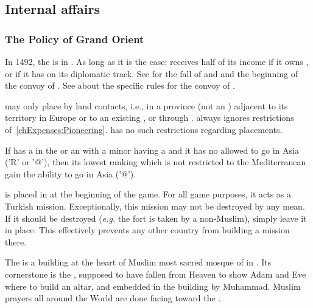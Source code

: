 \subsection{Internal affairs}
\subsubsection{The Policy of Grand Orient}
 In 1492, the  is in
. As long as it is the case:
\bparag \TUR receives half of its income if it owns , or if
it has  on its diplomatic track.
\bparag See  for the fall of  and
 and the beginning of the convoy of .
\bparag See  about the specific rules for the
convoy of .

 \TUR may only place \COL by land contacts,
i.e., in a province (not an \Area) adjacent to its territory in Europe
or to an existing \COL, or through .
\bparag \TUR always ignores restrictions
of~\ref{chExpenses:Pioneering}.
\bparag \TUR has no such restrictions regarding \TP placements.

\aparag If \TUR has a \TP in the \ROTW or an \dipAT with a minor
having a \TP and it has no \LeaderA allowed to go in Asia ('R' or '@'),
then its lowest ranking \LeaderA which is not restricted to the
Mediterranean gain the ability to go in Asia ('@').

\bparag {} is placed in  at the
beginning of the game.
\bparag For all game purposes, it acts as a Turkish mission.
\bparag Exceptionally, this mission may not be destroyed by any
mean. If it should be destroyed (\emph{e.g.} the fort is taken by a
non-Muslim), simply leave it in place. This effectively prevents any
other country from building a mission there.

\begin{histoire}
  The \constructionKaaba is a building at the heart of Muslim most
  sacred mosque of  in \villeMecca. Its
  cornerstone is the , supposed to have fallen from
  Heaven to show Adam and Eve where to build an altar, and embedded in
  the building by Muhammad. Muslim prayers all around the World are
  done facing toward the \constructionKaaba.
\end{histoire}

